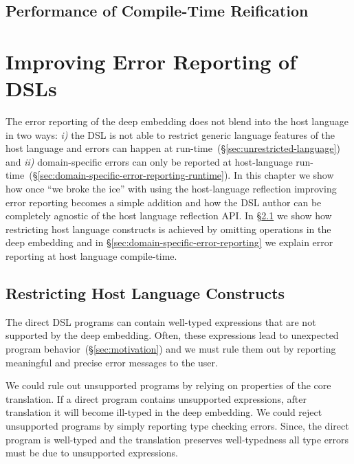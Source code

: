 \section{Performance of Compile-Time Reification}
\label{sec:performance-of-host-langauge-compile-time-reification}
%



\chapter{Improving Error Reporting of DSLs}
\label{sec:error-reporting}

The error reporting of the deep embedding does not blend into the host language in two ways:
 \emph{i)} the DSL is not able to restrict generic language features of the host language and errors can happen at run-time~(\S \ref{sec:unrestricted-language}) and \emph{ii)} domain-specific errors can only be reported at host-language run-time~(\S \ref{sec:domain-specific-error-reporting-runtime}). In this chapter we show how once ``we broke the ice'' with using the host-language reflection improving error reporting becomes a simple addition and how the DSL author can
 be completely agnostic of the host language reflection API. In \S \ref{sec:restricting} we
 show how restricting host language constructs is achieved by omitting operations in
 the deep embedding and in \S \ref{sec:domain-specific-error-reporting} we explain
 error reporting at host language compile-time.


\section{Restricting Host Language Constructs}
\label{sec:restricting}

The direct DSL programs can contain well-typed expressions that are not
supported by the deep embedding. Often, these expressions lead to unexpected program
behavior~(\S \ref{sec:motivation}) and we must rule them out by reporting meaningful and
precise error messages to the user.

We could rule out unsupported programs by relying on properties of the
core translation. If a direct program contains unsupported expressions, after
translation it will become ill-typed in the deep embedding. We could reject
unsupported programs by simply reporting type checking errors. Since, the
direct program is well-typed and the translation preserves well-typedness all
type errors must be due to unsupported expressions.

